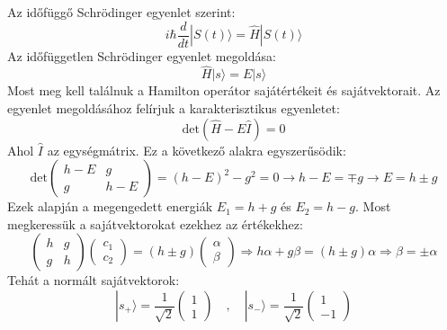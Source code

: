 \documentclass[../main.tex]{subfiles}
\begin{document}
Az időfüggő Schrödinger egyenlet szerint:
\begin{equation}
    i \hbar \frac{d}{dt} |S(t)\rangle = \hat{H} |S(t)\rangle
\end{equation}
Az időfüggetlen Schrödinger egyenlet megoldása:
\begin{equation}
    \hat{H} |s \rangle = E |s \rangle
\end{equation}
Most meg kell találnuk a Hamilton operátor sajátértékeit és sajátvektorait. Az egyenlet megoldásához felírjuk a karakterisztikus egyenletet:
\begin{equation}
    \text{det}(\hat{H} - E \hat{I}) = 0
\end{equation}
Ahol $\hat{I}$ az egységmátrix. Ez a következő alakra egyszerűsödik:
\begin{equation}
    \text{det}
    \begin{pmatrix}
        h - E & g \\
        g & h - E
    \end{pmatrix} = (h - E)^2 - g^2 = 0 \rightarrow h - E = \mp g \rightarrow E = h \pm g 
\end{equation}
Ezek alapján a megengedett energiák $E_1 = h + g$ és $E_2 = h - g$. Most megkeressük a sajátvektorokat ezekhez az értékekhez:
\begin{equation}
    \begin{pmatrix}
        h & g \\
        g & h
    \end{pmatrix}
    \begin{pmatrix}
        c_1 \\
        c_2
    \end{pmatrix} = 
    (h \pm g)
    \begin{pmatrix}
        \alpha \\
        \beta
    \end{pmatrix} \Rightarrow
    h\alpha + g \beta = (h \pm g) \alpha \Rightarrow \beta = \pm \alpha
\end{equation}
Tehát a normált sajátvektorok:
\begin{equation}
    |s_+ \rangle = \frac{1}{\sqrt{2}}
    \begin{pmatrix}
        1 \\
        1
    \end{pmatrix}
    \quad , \quad
    |s_- \rangle = \frac{1}{\sqrt{2}}
    \begin{pmatrix}
        1 \\
        -1
    \end{pmatrix}
\end{equation}
\end{document}

